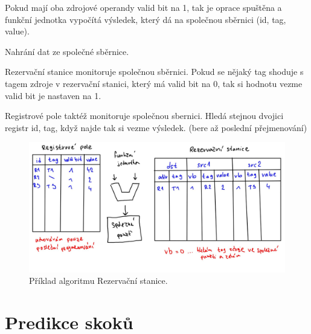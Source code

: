 \begin{compactitem}
\begin{compactenum}
        \item Pokud mají oba zdrojové operandy valid bit na 1, tak je oprace spuštěna a funkční jednotka vypočítá výsledek, který dá na společnou sběrnici (id, tag, value).

        \item Nahrání dat ze společné sběrnice. \begin{compactenum}
            \item Rezervační stanice monitoruje společnou sběrnici. Pokud se nějaký tag shoduje s tagem zdroje v rezervační stanici, který má valid bit na 0, tak si hodnotu vezme valid bit je nastaven na 1.
            \item Registrové pole taktéž monitoruje společnou sbernici. Hledá stejnou dvojici registr id, tag, když najde tak si vezme výsledek. (bere až poslední přejmenování)
        \end{compactenum}
    \end{compactenum}

    \begin{figure}[H]
        \centering
        \includegraphics[width=1\linewidth]{example_reserve_stations.jpg}
        \caption{Příklad algoritmu Rezervační stanice.}
    \end{figure}
\end{compactitem}


\section{Predikce skoků}

